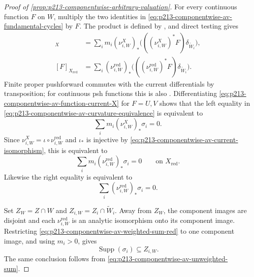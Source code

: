 \begin{proof}[Proof of
\cref{prop:p213-componentwise-arbitrary-valuation}]
For every continuous function $F$ on $W$, multiply the two identities in
\eqref{eq:p213-componentwise-av-fundamental-cycles} by $F$.  The product
is defined by \cite[Example~7.2.12]{CLD25}, and direct testing gives
\begin{align}
 [F]_X
 &=\sum_i m_i(\nu_{i,W}^X)_*
       \bigl(((\nu_{i,W}^X)^*F)\delta_{\widetilde W_i}\bigr),
 \label{eq:p213-componentwise-av-function-current-X}\\
 [F]_{X_{\mathrm{red}}}
 &=\sum_i(\nu_{i,W}^{\mathrm{red}})_*
       \bigl(((\nu_{i,W}^{\mathrm{red}})^*F)
                              \delta_{\widetilde W_i}\bigr).
 \label{eq:p213-componentwise-av-function-current-red}
\end{align}
Finite proper pushforward commutes with the current differentials by
transposition; for continuous psh functions this is also
\cite[Proposition~8.5.6]{CLD25}.  Differentiating
\eqref{eq:p213-componentwise-av-function-current-X} for $F=U,V$ shows
that the left equality in
\eqref{eq:p213-componentwise-av-curvature-equivalence} is equivalent to
\begin{equation}
 \label{eq:p213-componentwise-av-weighted-sum}
                 \sum_i m_i(\nu_{i,W}^X)_*\sigma_i=0.
\end{equation}
Since $\nu_{i,W}^X=\iota\circ\nu_{i,W}^{\mathrm{red}}$ and $\iota_*$ is
injective by \eqref{eq:p213-componentwise-av-current-isomorphism}, this is
equivalent to
\begin{equation}
 \label{eq:p213-componentwise-av-weighted-sum-red}
       \sum_i m_i(\nu_{i,W}^{\mathrm{red}})_*\sigma_i=0
       \qquad\text{on }X_{\mathrm{red}}.
\end{equation}
Likewise the right equality is equivalent to
\begin{equation}
 \label{eq:p213-componentwise-av-unweighted-sum}
                 \sum_i(\nu_{i,W}^{\mathrm{red}})_*\sigma_i=0.
\end{equation}

Set $Z_W=Z\cap W$ and $Z_{i,W}=Z_i\cap\widetilde W_i$.  Away from $Z_W$,
the component images are disjoint and each
$\nu_{i,W}^{\mathrm{red}}$ is an analytic isomorphism onto its component
image.  Restricting
\eqref{eq:p213-componentwise-av-weighted-sum-red} to one component image,
and using $m_i>0$, gives
\begin{equation}
 \label{eq:p213-componentwise-av-support}
                    \operatorname{Supp}(\sigma_i)\subseteq Z_{i,W}.
\end{equation}
The same conclusion follows from
\eqref{eq:p213-componentwise-av-unweighted-sum}.


\end{proof}
